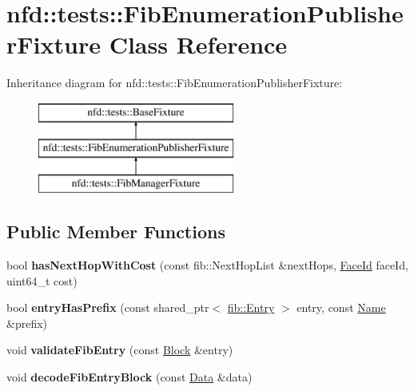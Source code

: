 \hypertarget{classnfd_1_1tests_1_1FibEnumerationPublisherFixture}{}\section{nfd\+:\+:tests\+:\+:Fib\+Enumeration\+Publisher\+Fixture Class Reference}
\label{classnfd_1_1tests_1_1FibEnumerationPublisherFixture}
Inheritance diagram for nfd\+:\+:tests\+:\+:Fib\+Enumeration\+Publisher\+Fixture\+:\begin{figure}[H]
\begin{center}
\leavevmode
\includegraphics[height=3.000000cm]{classnfd_1_1tests_1_1FibEnumerationPublisherFixture}
\end{center}
\end{figure}
\subsection*{Public Member Functions}
\begin{DoxyCompactItemize}
\item 
bool {\bfseries has\+Next\+Hop\+With\+Cost} (const fib\+::\+Next\+Hop\+List \&next\+Hops, \hyperlink{classFaceId}{Face\+Id} face\+Id, uint64\+\_\+t cost)\hypertarget{classnfd_1_1tests_1_1FibEnumerationPublisherFixture_a09f8ef6abcaff1cf2a6a5b00281d39b5}{}\label{classnfd_1_1tests_1_1FibEnumerationPublisherFixture_a09f8ef6abcaff1cf2a6a5b00281d39b5}

\item 
bool {\bfseries entry\+Has\+Prefix} (const shared\+\_\+ptr$<$ \hyperlink{classnfd_1_1fib_1_1Entry}{fib\+::\+Entry} $>$ entry, const \hyperlink{classndn_1_1Name}{Name} \&prefix)\hypertarget{classnfd_1_1tests_1_1FibEnumerationPublisherFixture_a93595d8d093bcfbe9b8f73c1928466d3}{}\label{classnfd_1_1tests_1_1FibEnumerationPublisherFixture_a93595d8d093bcfbe9b8f73c1928466d3}

\item 
void {\bfseries validate\+Fib\+Entry} (const \hyperlink{classndn_1_1Block}{Block} \&entry)\hypertarget{classnfd_1_1tests_1_1FibEnumerationPublisherFixture_a77d1c3846098bc650ea8a7b36fd82d29}{}\label{classnfd_1_1tests_1_1FibEnumerationPublisherFixture_a77d1c3846098bc650ea8a7b36fd82d29}

\item 
void {\bfseries decode\+Fib\+Entry\+Block} (const \hyperlink{classndn_1_1Data}{Data} \&data)\hypertarget{classnfd_1_1tests_1_1FibEnumerationPublisherFixture_ad767e0d4cb8df0225646f5c2b52e7703}{}\label{classnfd_1_1tests_1_1FibEnumerationPublisherFixture_ad767e0d4cb8df0225646f5c2b52e7703}

\end{DoxyCompactItemize}
